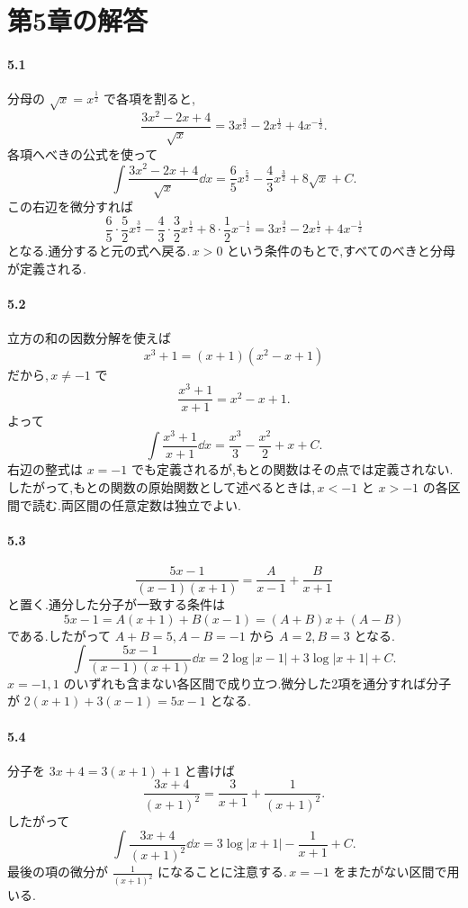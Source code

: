\section{第5章の解答}\label{解答:第5章}

\paragraph{5.1}
分母の $\sqrt{x}=x^{\frac12}$ で各項を割ると,
\[
 \frac{3x^2-2x+4}{\sqrt{x}}
 =3x^{\frac32}-2x^{\frac12}+4x^{-\frac12}.
\]
各項へべきの公式を使って
\[
 \int\frac{3x^2-2x+4}{\sqrt{x}}\dd x
 =\frac65x^{\frac52}-\frac43x^{\frac32}+8\sqrt{x}+C.
\]
この右辺を微分すれば
\[
 \frac65\cdot\frac52x^{\frac32}
 -\frac43\cdot\frac32x^{\frac12}
 +8\cdot\frac12x^{-\frac12}
 =3x^{\frac32}-2x^{\frac12}+4x^{-\frac12}
\]
となる.通分すると元の式へ戻る.\,$x>0$ という条件のもとで,すべてのべきと分母が定義される.

\paragraph{5.2}
立方の和の因数分解を使えば
\[
 x^3+1=(x+1)(x^2-x+1)
\]
だから,\,$x\ne-1$ で
\[
 \frac{x^3+1}{x+1}=x^2-x+1.
\]
よって
\[
 \int\frac{x^3+1}{x+1}\dd x
 =\frac{x^3}{3}-\frac{x^2}{2}+x+C.
\]
右辺の整式は $x=-1$ でも定義されるが,もとの関数はその点では定義されない.したがって,もとの関数の原始関数として述べるときは,\,$x<-1$ と $x>-1$ の各区間で読む.両区間の任意定数は独立でよい.

\paragraph{5.3}
\[
 \frac{5x-1}{(x-1)(x+1)}
 =\frac A{x-1}+\frac B{x+1}
\]
と置く.通分した分子が一致する条件は
\[
 5x-1=A(x+1)+B(x-1)=(A+B)x+(A-B)
\]
である.したがって $A+B=5$,\,$A-B=-1$ から $A=2$,\,$B=3$ となる.
\[
 \int\frac{5x-1}{(x-1)(x+1)}\dd x
 =2\log|x-1|+3\log|x+1|+C.
\]
$x=-1,1$ のいずれも含まない各区間で成り立つ.微分した2項を通分すれば分子が $2(x+1)+3(x-1)=5x-1$ となる.

\paragraph{5.4}
分子を $3x+4=3(x+1)+1$ と書けば
\[
 \frac{3x+4}{(x+1)^2}
 =\frac3{x+1}+\frac1{(x+1)^2}.
\]
したがって
\[
 \int\frac{3x+4}{(x+1)^2}\dd x
 =3\log|x+1|-\frac1{x+1}+C.
\]
最後の項の微分が $\frac1{(x+1)^2}$ になることに注意する.\,$x=-1$ をまたがない区間で用いる.

